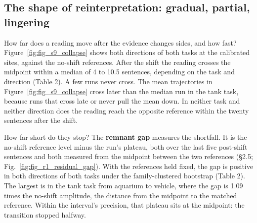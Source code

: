 \documentclass[11pt]{article}
\begin{document}
\subsection{The shape of reinterpretation: gradual, partial, lingering}

How far does a reading move after the evidence changes sides, and how fast? Figure~\ref{fig:fig_s9_collapse} shows both directions of both tasks at the calibrated sites, against
the no-shift references. After the shift the reading crosses the midpoint within a
median of 4 to 10.5 sentences, depending on the task and direction (Table 2). A few
runs never cross. The mean trajectories in Figure~\ref{fig:fig_s9_collapse} cross later than the
median run in the tank task, because runs that cross late or never pull the mean
down. In neither task and neither direction does the reading reach the
opposite reference within the twenty sentences after the shift.

How far short do they stop? The \textbf{remnant gap} measures the shortfall. It is the
no-shift reference level minus the run's plateau, both over the last five post-shift
sentences and both measured from the midpoint between the two references (\S2.5;
Fig.~\ref{fig:fig_r1_residual_gap}). With the references held fixed, the gap is positive in both directions of both
tasks under the family-clustered bootstrap (Table 2). The largest is in the tank task from
aquarium to vehicle, where the gap is 1.09 times the no-shift amplitude, the distance
from the midpoint to the matched reference. Within the interval's precision, that plateau sits at the midpoint: the transition
stopped halfway.
\end{document}
